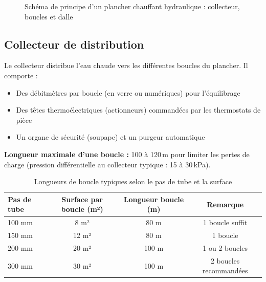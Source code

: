 \begin{figure}[H]
  \caption{Schéma de principe d'un plancher chauffant hydraulique : collecteur, boucles et dalle}
  \label{fig:pch-principe}
\end{figure}

\subsection{Collecteur de distribution}

Le collecteur distribue l'eau chaude vers les différentes boucles du plancher. Il comporte :
\begin{itemize}
  \item Des débitmètres par boucle (en verre ou numériques) pour l'équilibrage
  \item Des têtes thermoélectriques (actionneurs) commandées par les thermostats de pièce
  \item Un organe de sécurité (soupape) et un purgeur automatique
\end{itemize}

\textbf{Longueur maximale d'une boucle :} 100 à 120\,m pour limiter les pertes de charge (pression différentielle au collecteur typique : 15 à 30\,kPa).

\begin{table}[H]
  \centering
  \caption{Longueurs de boucle typiques selon le pas de tube et la surface}
  \begin{tabular}{lccc}
    \toprule
    Pas de tube & Surface par boucle (m²) & Longueur boucle (m) & Remarque \\
    \midrule
    100 mm & 8 m² & 80 m & 1 boucle suffit \\
    150 mm & 12 m² & 80 m & 1 boucle \\
    200 mm & 20 m² & 100 m & 1 ou 2 boucles \\
    300 mm & 30 m² & 100 m & 2 boucles recommandées \\
    \bottomrule
  \end{tabular}
\end{table}

